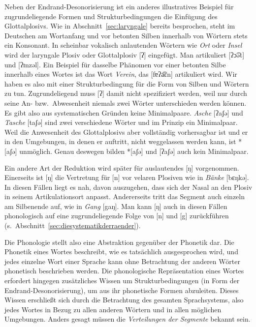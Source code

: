 Neben der Endrand-Desonorisierung ist ein anderes illustratives Beispiel für zugrundeliegende Formen und Strukturbedingungen die Einfügung des Glottalplosivs.
Wie in Abschnitt~\ref{sec:laryngale} bereits besprochen, steht im Deutschen am Wortanfang und vor betonten Silben innerhalb von Wörtern stets ein Konsonant.
In scheinbar vokalisch anlautenden Wörtern wie \textit{Ort} oder \textit{Insel} wird der laryngale Plosiv oder Glottalplosiv [ʔ] eingefügt.
Man artikuliert [ʔɔ͡ət] und [ʔɪnzəl].
Ein Beispiel für dasselbe Phänomen vor einer betonten Silbe innerhalb eines Wortes ist das Wort \textit{Verein}, das [fɐʔa͡ɛn] artikuliert wird.
Wir haben es also mit einer Strukturbedingung für die Form von Silben und Wörtern zu tun.
Zugrundeliegend muss [ʔ] damit nicht spezifiziert werden, weil nur durch seine An- bzw.\ Abwesenheit niemals zwei Wörter unterschieden werden können.
Es gibt also aus systematischen Gründen keine Minimalpaare.
\textit{Asche} [ʔaʃə] und \textit{Tasche} [taʃə] sind zwei verschiedene Wörter und im Prinzip ein Minimalpaar.
Weil die Anwesenheit des Glottalplosivs aber vollständig vorhersagbar ist und er in den Umgebungen, in denen er auftritt, nicht weggelassen werden kann, ist *[aʃə] unmöglich.
Genau deswegen bilden *[aʃə] und [ʔaʃə] auch kein Minimalpaar.

Ein andere Art der Reduktion wird später für auslautendes [ŋ] vorgenommen.
Einerseits ist [ŋ] die Vertretung für [n] vor velaren Plosiven wie in \textit{Bänke} [bɛŋkə].
In diesen Fällen liegt es nah, davon auszugehen, dass sich der Nasal an den Plosiv in seinem Artikulationsort anpasst.
Andererseits tritt das Segment auch einzeln am Silbenende auf, wie in \textit{Gang} [gaŋ].
Man kann [ŋ] auch in diesen Fällen phonologisch auf eine zugrundeliegende Folge von [n] und [g] zurückführen (s.\ Abschnitt~\ref{sec:diesystematikderraender}).

Die Phonologie stellt also eine Abstraktion gegenüber der Phonetik dar.
Die Phonetik eines Wortes beschreibt, wie es tatsächlich ausgesprochen wird, und jedes einzelne Wort einer Sprache kann ohne Betrachtung der anderen Wörter phonetisch beschrieben werden.
Die phonologische Repräsentation eines Wortes erfordert hingegen zusätzliches Wissen um Strukturbedingungen (\zB in Form der Endrand-Desonorisierung), um aus ihr phonetische Formen abzuleiten.
Dieses Wissen erschließt sich durch die Betrachtung des gesamten Sprachsystems, also jedes Wortes in Bezug zu allen anderen Wörtern und in allen möglichen Umgebungen.
Anders gesagt müssen die \textit{Verteilungen der Segmente} bekannt sein.

